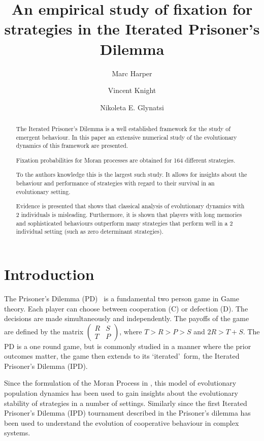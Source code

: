 \documentclass{article}
\title{An empirical study of fixation for strategies in the
       Iterated Prisoner's Dilemma}
\author{Marc Harper \and Vincent Knight \and Nikoleta E. Glynatsi} %
\date{}
\begin{document}
\maketitle

\begin{abstract}
    The Iterated Prisoner's Dilemma is a well established framework for
    the study of emergent behaviour. In this paper an extensive numerical
    study of the evolutionary dynamics of this framework are presented.

    Fixation probabilities for Moran processes are obtained for 164
    different strategies.

    To the authors knowledge this is the largest
    such study. It allows for insights about the behaviour and
    performance of strategies with regard to their survival in an
    evolutionary setting.

    Evidence is presented that shows that classical analysis of evolutionary
    dynamics with 2 individuals is misleading. Furthermore, it is shown that
    players with long memories and sophisticated behaviours outperform many
    strategies that perform well in a 2 individual setting (such as zero
    determinant strategies).

\end{abstract}

\section{Introduction}\label{sec:introduction}

The Prisoner's Dilemma (PD)~\cite{Flood1958} is a fundamental two person game 
in Game theory. Each player can choose between cooperation (C) or defection 
(D). The decisions are made simultaneously and independently. The payoffs of
the game are defined by the matrix $\begin{pmatrix} R & S \\ T & P
\end{pmatrix}$, where $T > R > P> S$ and $2R > T + S$. The PD is a one 
round game, but is commonly studied in a manner where the prior outcomes 
matter, the game then extends to its `iterated'\ form, the Iterated Prisoner's 
Dilemma (IPD). 

Since the formulation of the Moran Process in \cite{Moran1957}, this model of
evolutionary population dynamics has been used to gain insights about the
evolutionary stability of strategies in a number of settings. Similarly since
the first Iterated Prisoner's Dilemma (IPD) tournament described in
\cite{Axelrod1980a} the Prisoner's dilemma has been used to understand the
evolution of cooperative behaviour in complex systems.
\end{document}

